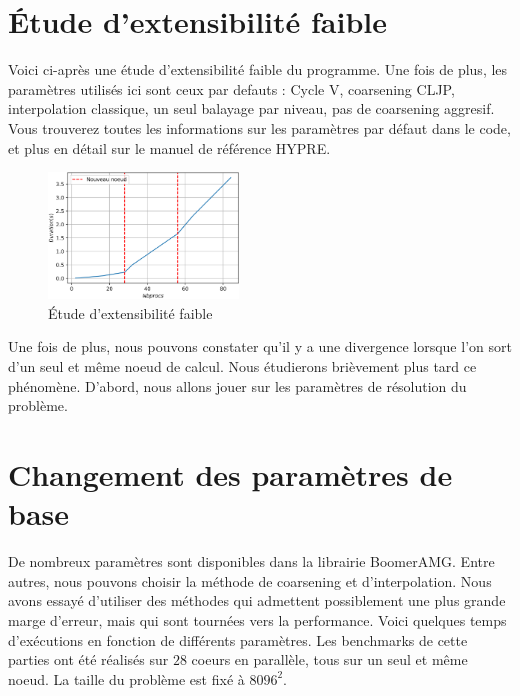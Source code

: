 \documentclass[10pt,twocolumn,letterpaper]{article}
\begin{document}
\section{Étude d'extensibilité faible}

Voici ci-après une étude d'extensibilité faible du programme. Une fois de plus,
les paramètres utilisés ici sont ceux par defauts : Cycle V, coarsening CLJP,
interpolation classique, un seul balayage par niveau, pas de coarsening aggresif.
Vous trouverez toutes les informations sur les paramètres par défaut dans le
code, et plus en détail sur le manuel de référence HYPRE.

\begin{figure}[H]
    \centering
    \caption{Étude d'extensibilité faible}
    \includegraphics[width=0.45\textwidth]{fig/weak_scalab.png}
  \end{figure}

Une fois de plus, nous pouvons constater qu'il y a une divergence lorsque l'on
sort d'un seul et même noeud de calcul. Nous étudierons brièvement plus tard
ce phénomène. 
D'abord, nous allons jouer sur les paramètres de résolution du problème.


\section{Changement des paramètres de base}

De nombreux paramètres sont disponibles dans la librairie BoomerAMG. Entre
autres, nous pouvons choisir la méthode de coarsening et d'interpolation.
Nous avons essayé d'utiliser des méthodes qui admettent possiblement une plus
grande marge d'erreur, mais qui sont tournées vers la performance.
Voici quelques temps d'exécutions en fonction de différents paramètres. Les
benchmarks de cette parties ont été réalisés sur $28$ coeurs en parallèle, tous
sur un seul et même noeud. La taille du problème est fixé à $8096^2$.
\end{document}
